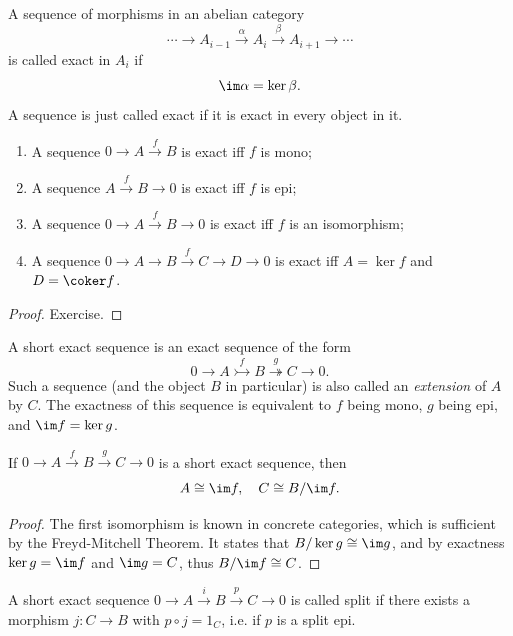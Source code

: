 \begin{defn}
    A sequence of morphisms in an abelian category 
    \[\cdots \to A_{i-1}\overset{\alpha}\to A_i\overset{\beta}\to A_{i+1}\to \cdots\]
    is called exact in $A_i$ if 
    \[\im\alpha=\ker\beta.\]
    A sequence is just called exact if it is exact in every object in it.
\end{defn}

\begin{prop}
    \begin{enumerate}
        \item A sequence $0\to A\overset f\to B$ is exact iff $f$ is mono;
        \item A sequence $A\overset f\to B\to 0$ is exact iff $f$ is epi;
        \item A sequence $0\to A\overset f\to B\to 0$ is exact iff $f$ is an isomorphism;
        \item A sequence $0\to A\to B\overset f\to C\to D\to 0$ is exact iff $A=\ker f$ and $D=\coker f$.
    \end{enumerate}
\end{prop}
\begin{proof}
    Exercise.
\end{proof}

\begin{defn}
 A short exact sequence is an exact sequence of the form
 \[0\to A\overset f\rightarrowtail B\overset g \twoheadrightarrow C\to 0.\]
 Such a sequence (and the object $B$ in particular) is also called an \emph{extension} of $A$ by $C$. The exactness of this sequence is equivalent to $f$ being mono, $g$ being epi, and $\im f=\ker g$.
\end{defn}

\begin{prop}
    If $0\to A\overset f\to B\overset g \to C\to 0$ is a short exact sequence, then 
    \[A\cong \im f,\quad C\cong B/\im f.\]
\end{prop}
\begin{proof}
    The first isomorphism is known in concrete categories, which is sufficient by the Freyd-Mitchell Theorem. It states that $B/\ker g\cong \im g$, and by exactness $\ker g=\im f$ and $\im g=C$, thus $B/\im f\cong C$.
\end{proof}

\begin{defn}
    A short exact sequence $0\to A\overset i\to B\overset p \to C\to 0$ is called split if there exists a morphism $j:C\to B$ with $p\circ j=1_C$, i.e. if $p$ is a split epi.
\end{defn}

